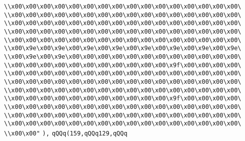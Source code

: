 \verb|\\x00\x00\x00\x00\x00\x00\x00\x00\x00\x00\x00\x00\x00\x00\x00\x00\|\newline
\verb|\\x00\x00\x00\x00\x00\x00\x00\x00\x00\x00\x00\x00\x00\x00\x00\x00\|\newline
\verb|\\x00\x00\x00\x00\x00\x00\x00\x00\x00\x00\x00\x00\x00\x00\x00\x00\|\newline
\verb|\\x00\x00\x00\x00\x00\x00\x00\x00\x00\x00\x00\x00\x00\x00\x00\x00\|\newline
\verb|\\x00\x00\x00\x00\x00\x00\x00\x00\x00\x00\x00\x00\x00\x00\x00\x00\|\newline
\verb|\\x00\x9e\x00\x9e\x00\x9e\x00\x9e\x00\x9e\x00\x9e\x00\x9e\x00\x9e\|\newline
\verb|\\x00\x9e\x00\x9e\x00\x00\x00\x00\x00\x00\x00\x00\x00\x00\x00\x00\|\newline
\verb|\\x00\x00\x00\x00\x00\x00\x00\x00\x00\x00\x00\x9f\x00\x00\x00\x00\|\newline
\verb|\\x00\x00\x00\x00\x00\x00\x00\x00\x00\x00\x00\x00\x00\x00\x00\x00\|\newline
\verb|\\x00\x00\x00\x00\x00\x00\x00\x00\x00\x00\x00\x00\x00\x00\x00\x00\|\newline
\verb|\\x00\x00\x00\x00\x00\x00\x00\x00\x00\x00\x00\x00\x00\x00\x00\x00\|\newline
\verb|\\x00\x00\x00\x00\x00\x00\x00\x00\x00\x00\x00\x9f\x00\x00\x00\x00\|\newline
\verb|\\x00\x00\x00\x00\x00\x00\x00\x00\x00\x00\x00\x00\x00\x00\x00\x00\|\newline
\verb|\\x00\x00\x00\x00\x00\x00\x00\x00\x00\x00\x00\x00\x00\x00\x00\x00\|\newline
\verb|\\x00\x00\x00\x00\x00\x00\x00\x00\x00\x00\x00\x00\x00\x00\x00\x00\|\newline
\verb|\\x00\x00"|\newline
\verb|),|\newline
\verb|qQQq(159,qQQq129,qQQq|\newline
